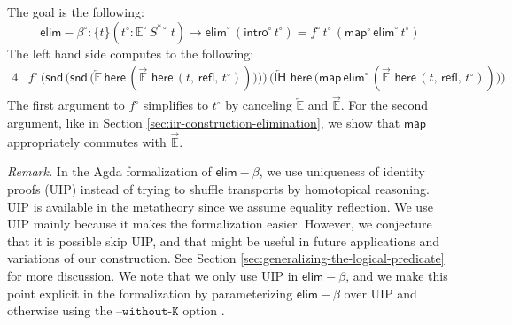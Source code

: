 \documentclass[acmsmall,screen,review]{acmart}
\newcommand{\msf}[1]{{\mathsf{#1}}}
\newcommand{\mbb}[1]{\mathbb{#1}}
\newcommand{\intro}{\msf{intro}}
\newcommand{\IH}{\msf{IH}}
\newcommand{\map}{\msf{map}}
\newcommand{\elim}{\msf{elim}}
\newcommand{\snd}{\msf{snd}}
\newcommand{\ora}[1]{\overrightarrow{#1}}
\newcommand{\ola}[1]{\overleftarrow{#1}}
\newcommand{\w}{\circ}
\newcommand{\refl}{\msf{refl}}
\newcommand{\here}{\msf{here}}
\newcommand{\elimbeta}{\elim\!-\!\!\beta}
\newcommand{\E}{\mbb{E}}
\begin{document}
\begin{definition}[Interpretation of $\elimbeta$]
The goal is the following:
\[ \elimbeta^\w : \{t\}(t^\w : \E^\w\,S^{*\w}\,t) \to \elim^\w\,(\intro^\w\,t^\w) = f^\w\,t^\w\,(\map^\w\,\elim^\w\,t^\w) \]
The left hand side computes to the following:
\begin{alignat*}{4}
  &f^\w\,\Big(\snd\,\big(\snd\,\big(\ola{\E}\,\here\,(\ora{\E}\,\,\here\,(t,\,\refl,\,t^\w))\big)\big)\Big)\,\Big(\ola{\IH}\,\,\here\,\big(\map\,\elim^\w\,(\ora{\E}\,\,\here\,(t,\,\refl,\,t^\w))\big)\Big)
\end{alignat*}
The first argument to $f^\w$ simplifies to $t^\w$ by canceling $\ola{\E}$ and $\ora{\E}$.  For the
second argument, like in Section \ref{sec:iir-construction-elimination}, we show that $\map$
appropriately commutes with $\ora{\E}$.

\emph{Remark.} In the Agda formalization of $\elimbeta$, we use uniqueness of identity proofs (UIP)
instead of trying to shuffle transports by homotopical reasoning. UIP is available in the metatheory
since we assume equality reflection. We use UIP mainly because it makes the
formalization easier. However, we conjecture that it is possible skip UIP, and that might be useful in
future applications and variations of our construction. See Section
\ref{sec:generalizing-the-logical-predicate} for more discussion. We note that we only use UIP in
$\elimbeta$, and we make this point explicit in the formalization by parameterizing $\elimbeta$ over
UIP and otherwise using the $\texttt{--without-K}$ option \cite{agdadocs-withoutk}.

\end{definition}
\end{document}
